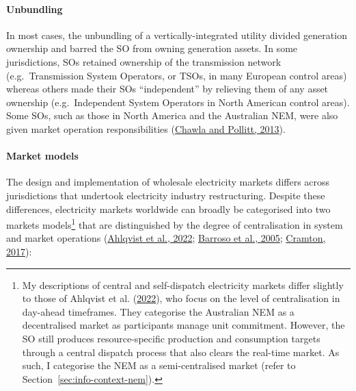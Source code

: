 \documentclass[12pt,a4paper,]{report}
\begin{document}
\hypertarget{unbundling}{%
\paragraph{Unbundling}\label{unbundling}}

In most cases, the unbundling of a vertically-integrated utility divided
generation ownership and barred the SO from owning generation assets. In
some jurisdictions, SOs retained ownership of the transmission network
(e.g.~Transmission System Operators, or TSOs, in many European control
areas) whereas others made their SOs ``independent'' by relieving them
of any asset ownership (e.g.~Independent System Operators in North
American control areas). Some SOs, such as those in North America and
the Australian NEM, were also given market operation responsibilities
(\protect\hyperlink{ref-chawlaGlobalTrendsElectricity2013}{Chawla and
Pollitt, 2013}).

\hypertarget{market-models}{%
\paragraph{Market models}\label{market-models}}

The design and implementation of wholesale electricity markets differs
across jurisdictions that undertook electricity industry restructuring.
Despite these differences, electricity markets worldwide can broadly be
categorised into two markets models\footnote{My descriptions of central
  and self-dispatch electricity markets differ slightly to those of
  Ahlqvist et al.
  (\protect\hyperlink{ref-ahlqvistSurveyComparingCentralized2022}{2022}),
  who focus on the level of centralisation in day-ahead timeframes. They
  categorise the Australian NEM as a decentralised market as
  participants manage unit commitment. However, the SO still produces
  resource-specific production and consumption targets through a central
  dispatch process that also clears the real-time market. As such, I
  categorise the NEM as a semi-centralised market (refer to
  Section~\ref{sec:info-context-nem}).} that are distinguished by the
degree of centralisation in system and market operations
(\protect\hyperlink{ref-ahlqvistSurveyComparingCentralized2022}{Ahlqvist
et al., 2022};
\protect\hyperlink{ref-barrosoClassificationElectricityMarket2005}{Barroso
et al., 2005};
\protect\hyperlink{ref-cramtonElectricityMarketDesign2017}{Cramton,
2017}):
\end{document}
